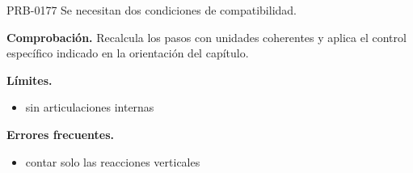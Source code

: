 \begin{studiumworked}{PRB-0177}
Se necesitan dos condiciones de compatibilidad.

\par\textbf{Comprobación.} Recalcula los pasos con unidades coherentes y aplica el control específico indicado en la orientación del capítulo.

\textbf{Límites.}\begin{itemize}\item sin articulaciones internas\end{itemize}

\textbf{Errores frecuentes.}\begin{itemize}\item contar solo las reacciones verticales\end{itemize}

\end{studiumworked}

\Needspace{.3\textheight}

